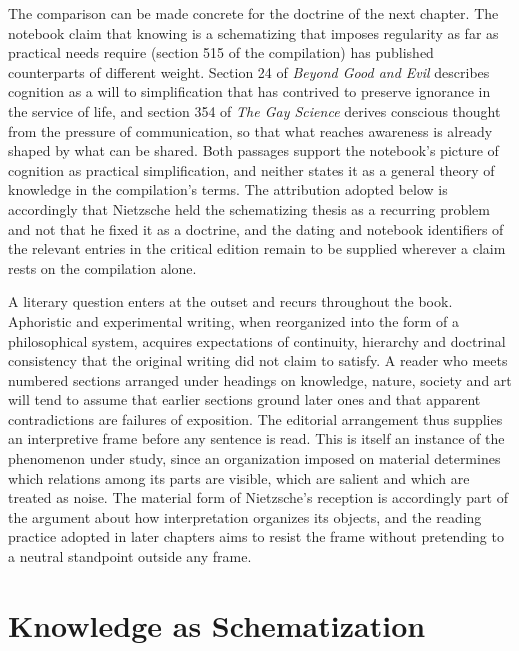 The comparison can be made concrete for the doctrine of the next chapter. The notebook claim that knowing is a schematizing that imposes regularity as far as practical needs require (section 515 of the compilation) has published counterparts of different weight. Section 24 of \emph{Beyond Good and Evil} describes cognition as a will to simplification that has contrived to preserve ignorance in the service of life, and section 354 of \emph{The Gay Science} derives conscious thought from the pressure of communication, so that what reaches awareness is already shaped by what can be shared. Both passages support the notebook's picture of cognition as practical simplification, and neither states it as a general theory of knowledge in the compilation's terms. The attribution adopted below is accordingly that Nietzsche held the schematizing thesis as a recurring problem and not that he fixed it as a doctrine, and the dating and notebook identifiers of the relevant entries in the critical edition remain to be supplied wherever a claim rests on the compilation alone.

A literary question enters at the outset and recurs throughout the book. Aphoristic and experimental writing, when reorganized into the form of a philosophical system, acquires expectations of continuity, hierarchy and doctrinal consistency that the original writing did not claim to satisfy. A reader who meets numbered sections arranged under headings on knowledge, nature, society and art will tend to assume that earlier sections ground later ones and that apparent contradictions are failures of exposition. The editorial arrangement thus supplies an interpretive frame before any sentence is read. This is itself an instance of the phenomenon under study, since an organization imposed on material determines which relations among its parts are visible, which are salient and which are treated as noise. The material form of Nietzsche's reception is accordingly part of the argument about how interpretation organizes its objects, and the reading practice adopted in later chapters aims to resist the frame without pretending to a neutral standpoint outside any frame.

\chapter{Knowledge as Schematization}

